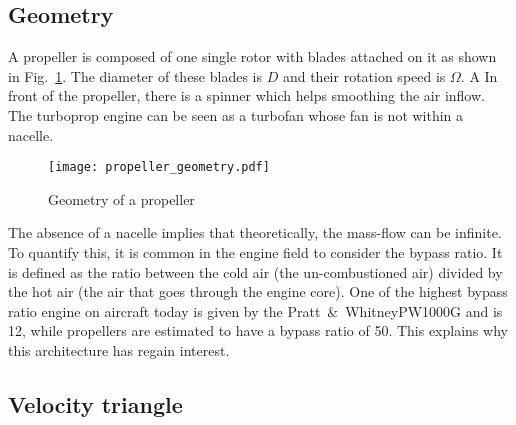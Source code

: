 
\subsection{Geometry}
\label{sub:cror_propeller_geometry}

A propeller is composed of one single rotor with blades
attached on it as shown in
Fig.~\ref{fig:cror_propeller_geometry}. 
The diameter of these blades is $D$
and their rotation speed is $\Omega$. 
A In front of the propeller, there is a spinner which helps
smoothing the air inflow.
The turboprop engine can be seen as
a turbofan whose fan is not within a nacelle.
\begin{figure}[htb]
  \centering
  \texttt{[image: propeller\_geometry.pdf]}
  \caption{Geometry of a propeller}
  \label{fig:cror_propeller_geometry}
\end{figure}
The absence of a nacelle implies that theoretically, the mass-flow can be
infinite. To quantify this, it is common in the engine field to
consider the bypass ratio. It is defined as the ratio between the
cold air (the un-combustioned air)
divided by the hot air (the air that goes through the engine core).
One of the highest bypass ratio engine on aircraft today is given
by the Pratt~\&~WhitneyPW1000G and is 12, while propellers are estimated
to have a bypass ratio of 50. This explains why this architecture has
regain interest.

\subsection{Velocity triangle}
\label{sub:cror_propeller_velocity_triangle}


